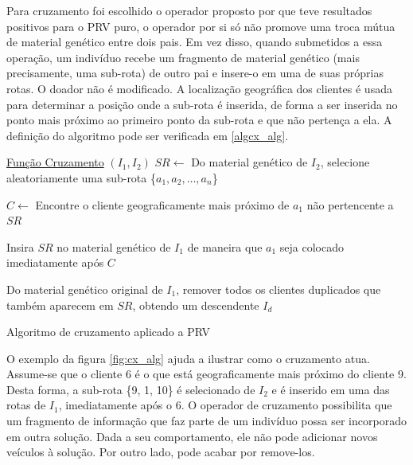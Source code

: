 Para cruzamento foi escolhido o operador proposto por \cite{Pereira_Tavares} que teve resultados positivos para o PRV puro, o operador por si só não promove uma troca mútua de material genético entre dois pais. Em vez disso, quando submetidos a essa operação, um indivíduo recebe um fragmento de material genético (mais precisamente, uma sub-rota) de outro pai e insere-o em uma de suas próprias rotas. O doador não é modificado. A localização geográfica dos clientes é usada para determinar a posição onde a sub-rota é inserida, de forma a ser inserida no ponto mais próximo ao primeiro ponto da sub-rota e que não pertença a ela. A definição do algoritmo pode ser verificada em \ref{algcx_alg}.

\begin{algorithm}
	   
	\underline{Função Cruzamento} $(I_1,I_2)$\;
	\BlankLine
	$SR \leftarrow $ Do material genético de $I_2$, selecione  aleatoriamente uma sub-rota \{$a_1, a_2,…, a_n$\}
	
	$C \leftarrow $ Encontre o cliente geograficamente mais próximo de $a_1$ não pertencente a $SR$
		
	Insira $SR$ no material genético de $I_1$ de maneira que $a_1$ seja
	colocado imediatamente após $C$

	
	Do material genético original de $I_1$, remover todos os 
	clientes duplicados que também aparecem em $SR$, obtendo um descendente $I_d$ 
	
	\nl{}

	\caption{Algoritmo de cruzamento aplicado a PRV}\label{algcx_alg}
\end{algorithm}

O exemplo da figura \ref{fig:cx_alg} ajuda a ilustrar como o cruzamento atua. Assume-se que o cliente 6 é o que está geograficamente mais próximo do cliente 9. Desta forma, a sub-rota
\{9, 1, 10\} é selecionado de $I_2$ e é inserido em uma das rotas de $I_1$, imediatamente após o 6. O operador de cruzamento possibilita que um fragmento de informação que faz parte de um indivíduo possa ser incorporado em outra solução. Dada a seu comportamento, ele não pode adicionar novos veículos à solução. Por outro lado, pode acabar por remove-los.

\begin{center}
	\label{fig:cx_alg}
\end{center}


